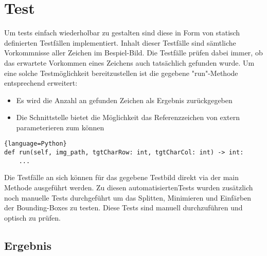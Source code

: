 \section{Test}
\label{sec-tests}
Um tests einfach wiederholbar zu gestalten sind diese in Form von statisch definierten Testfällen implementiert. Inhalt dieser Testfälle sind sämtliche Vorkommnisse 
aller Zeichen im Bespiel-Bild. Die Testfälle prüfen dabei immer, ob das erwartete Vorkommen eines Zeichens auch tatsächlich gefunden wurde. Um eine solche Testmöglichkeit
bereitzustellen ist die gegebene "run"-Methode entsprechend erweitert:
\begin{itemize}
    \item Es wird die Anzahl an gefunden Zeichen als Ergebnis zurückgegeben
    \item Die Schnittstelle bietet die Möglichkeit das Referenzzeichen von extern parameterieren zum können
\end{itemize}

\begin{lstlisting}{language=Python}
def run(self, img_path, tgtCharRow: int, tgtCharCol: int) -> int:
    ...
\end{lstlisting}

Die Testfälle an sich können für das gegebene Testbild direkt via der main Methode ausgeführt werden. Zu diesen \glqq automatisierten\grqq\space Tests 
wurden zusätzlich noch manuelle Tests durchgeführt um das Splitten, Minimieren und Einfärben der Bounding-Boxes zu testen. Diese Tests sind manuell 
durchzuführen und optisch zu prüfen.

\subsection{Ergebnis}
